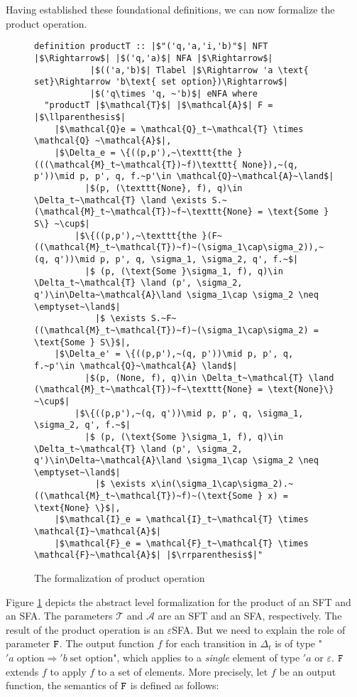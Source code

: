 \documentclass[a4paper,UKenglish,cleveref, autoref, thm-restate]{lipics-v2021}
\begin{document}
Having established these foundational definitions, we can now formalize the product operation. 

\begin{figure}[hbt!]
	\begin{lstlisting}
definition productT :: |$"('q,'a,'i,'b)"$| NFT |$\Rightarrow$| |$('q,'a)$| NFA |$\Rightarrow$| 
           |$(('a,'b)$| Tlabel |$\Rightarrow 'a \text{ set}\Rightarrow 'b\text{ set option})\Rightarrow$|
           |$('q\times 'q, ~'b)$| eNFA where
  "productT |$\mathcal{T}$| |$\mathcal{A}$| F = |$\llparenthesis$|
    |$\mathcal{Q}e = \mathcal{Q}_t~\mathcal{T} \times \mathcal{Q} ~\mathcal{A}$|,
    |$\Delta_e = \{((p,p'),~\texttt{the }(((\mathcal{M}_t~\mathcal{T})~f)\texttt{ None}),~(q, p'))\mid p, p', q, f.~p'\in \mathcal{Q}~\mathcal{A}~\land$|
          |$(p, (\texttt{None}, f), q)\in \Delta_t~\mathcal{T} \land \exists S.~(\mathcal{M}_t~\mathcal{T})~f~\texttt{None} = \text{Some } S\} ~\cup$|
        |$\{((p,p'),~\texttt{the }(F~((\mathcal{M}_t~\mathcal{T})~f)~(\sigma_1\cap\sigma_2)),~(q, q'))\mid p, p', q, \sigma_1, \sigma_2, q', f.~$|
          |$ (p, (\text{Some }\sigma_1, f), q)\in \Delta_t~\mathcal{T} \land (p', \sigma_2, q')\in\Delta~\mathcal{A}\land \sigma_1\cap \sigma_2 \neq \emptyset~\land$|
            |$ \exists S.~F~((\mathcal{M}_t~\mathcal{T})~f)~(\sigma_1\cap\sigma_2) = \text{Some } S\}$|,
    |$\Delta_e' = \{((p,p'),~(q, p'))\mid p, p', q, f.~p'\in \mathcal{Q}~\mathcal{A} \land$|
          |$(p, (None, f), q)\in \Delta_t~\mathcal{T} \land (\mathcal{M}_t~\mathcal{T})~f~\texttt{None} = \text{None}\} ~\cup$|
        |$\{((p,p'),~(q, q'))\mid p, p', q, \sigma_1, \sigma_2, q', f.~$|
          |$ (p, (\text{Some }\sigma_1, f), q)\in \Delta_t~\mathcal{T} \land (p', \sigma_2, q')\in\Delta~\mathcal{A}\land \sigma_1\cap \sigma_2 \neq \emptyset~\land$|
            |$ \exists x\in(\sigma_1\cap\sigma_2).~((\mathcal{M}_t~\mathcal{T})~f)~(\text{Some } x) = \text{None} \}$|,
    |$\mathcal{I}_e = \mathcal{I}_t~\mathcal{T} \times \mathcal{I}~\mathcal{A}$|
    |$\mathcal{F}_e = \mathcal{F}_t~\mathcal{T} \times \mathcal{F}~\mathcal{A}$| |$\rrparenthesis$|"
	\end{lstlisting}
\caption{The formalization of product operation}
\label{fig-def-FTProd}
\end{figure}

Figure \ref{fig-def-FTProd} depicts the abstract level formalization for the product of an SFT and an SFA. The parameters $\mathcal{T}$ and $\mathcal{A}$ are an SFT and an SFA, respectively. The 
result of the product operation is an $\varepsilon$SFA.
But we need to explain the role of parameter $\text{\texttt{F}}$. The output function $f$ for each transition in $\Delta_t$ is of type "$'a\;\text{option} \Rightarrow 'b\;\text{set option}$", which applies to a \emph{single} element of type $'a$ or $\varepsilon$. $\text{\texttt{F}}$ extends $f$ to apply $f$ to a set of elements. More precisely, let $f$ be an output function, the semantics of $\text{\texttt{F}}$ is defined as follows:
\end{document}

